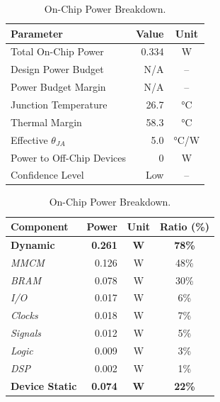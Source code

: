 \documentclass[11pt]{article}
\begin{document}
\begin{table}[H]
    \centering 
    \begin{minipage}[b]{0.46\textwidth}
        \flushleft
        \captionsetup{type=table, singlelinecheck=false, justification=raggedright, skip=2pt}
        \caption{Power Analysis Summary.}
        \label{tab:main_power}
        \small
        \begin{tabular}{lrc}
            \toprule
            \textbf{Parameter} & \textbf{Value} & \textbf{Unit} \\
            \midrule
            Total On-Chip Power            & 0.334 & W   \\
            Design Power Budget            & N/A   & --  \\
            Power Budget Margin            & N/A   & --  \\
            Junction Temperature           & 26.7  & °C  \\
            Thermal Margin                 & 58.3  & °C  \\
            Effective $\theta_{JA}$        & 5.0   & °C/W\\
            Power to Off-Chip Devices      & 0     & W   \\
            Confidence Level               & Low   & --  \\
            \bottomrule
        \end{tabular}
    \end{minipage}%
    \hfill 
    \begin{minipage}[b]{0.50\textwidth}
        \flushleft
        \captionsetup{type=table, singlelinecheck=false, justification=raggedright, skip=2pt}
        \caption{On-Chip Power Breakdown.}
        \label{tab:power_dynamic_breakdown}
        \small
        \begin{tabular}{lrcc}
            \toprule
            \textbf{Component} & \textbf{Power} & \textbf{Unit} & \textbf{Ratio (\%)} \\
            \midrule
            \textbf{Dynamic}   & \textbf{0.261} & \textbf{W} & \textbf{78\%} \\
            \quad \textit{MMCM}               & 0.126 & W & 48\% \\
            \quad \textit{BRAM}               & 0.078 & W & 30\% \\
            \quad \textit{I/O}                & 0.017 & W &  6\% \\
            \quad \textit{Clocks}             & 0.018 & W &  7\% \\
            \quad \textit{Signals}            & 0.012 & W &  5\% \\
            \quad \textit{Logic}              & 0.009 & W &  3\% \\
            \quad \textit{DSP}                & 0.002 & W &  1\% \\
            \midrule
            \textbf{Device Static} & \textbf{0.074} & \textbf{W} & \textbf{22\%} \\
            \bottomrule
        \end{tabular}
    \end{minipage}
    
\end{table}
\end{document}
